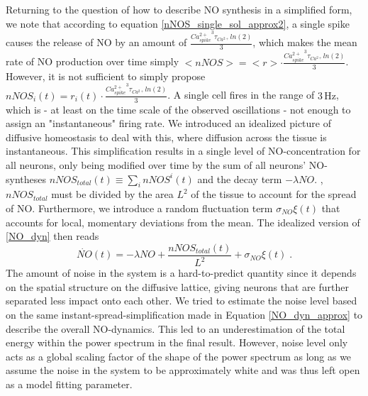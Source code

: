 \documentclass[10pt,a4paper]{article}
\begin{document}
Returning to the question of how to describe NO synthesis in a simplified form, we note that according to equation \eqref{nNOS_single_sol_approx2}, a single spike causes the release of NO by an amount of $\frac{{Ca^{2+}_{spike}}^3 \tau_{Ca^{2+}}ln(2)}{3}$, which makes the mean rate of NO production over time simply $<nNOS> = <r> \cdot \frac{{Ca^{2+}_{spike}}^3 \tau_{Ca^{2+}}ln(2)}{3}$. However, it is not sufficient to simply propose $nNOS_i(t) = r_i(t) \cdot \frac{{Ca^{2+}_{spike}}^3 \tau_{Ca^{2+}}ln(2)}{3}$. A single cell fires in the range of $\mathrm{3\,Hz}$, which is - at least on the time scale of the observed oscillations - not enough to assign an "instantaneous" firing rate.
\newpage
We introduced an idealized picture of diffusive homeostasis to deal with this, where diffusion across the tissue is instantaneous. This simplification results in a single level of NO-concentration for all neurons, only being modified over time by the sum of all neurons' NO-syntheses $nNOS_{total}(t) \equiv \sum_{i} nNOS^i(t)$ and the decay term $-\lambda NO$. , $nNOS_{total}$ must be divided by the area $L^2$ of the tissue to account for the spread of NO. Furthermore, we introduce a random fluctuation term $\sigma_{NO} \xi(t)$ that accounts for local, momentary deviations from the mean. The idealized version of \eqref{NO_dyn} then reads
\begin{equation}
\dot{NO}(t)=-\lambda NO + \frac{nNOS_{total}(t)}{L^2} + \sigma_{NO} \xi(t)\;.
\label{NO_dyn_approx}
\end{equation}
The amount of noise in the system is a hard-to-predict quantity since it depends on the spatial structure on the diffusive lattice, giving neurons that are further separated less impact onto each other. We tried to estimate the noise level based on the same instant-spread-simplification made in Equation \eqref{NO_dyn_approx} to describe the overall NO-dynamics. This led to an underestimation of the total energy within the power spectrum in the final result. However, noise level only acts as a global scaling factor of the shape of the power spectrum as long as we assume the noise in the system to be approximately white and was thus left open as a model fitting parameter.
\end{document}
